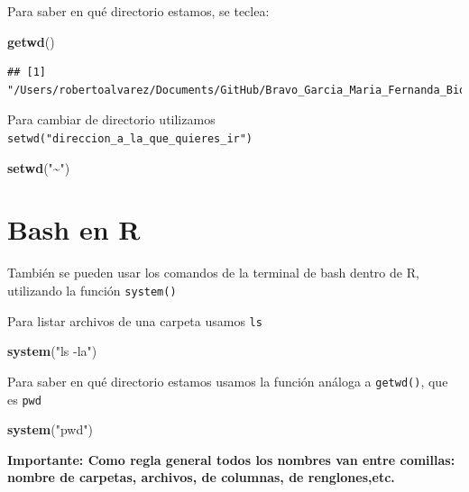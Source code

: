 \documentclass[
]{book}
\newenvironment{Shaded}{\begin{snugshade}}{\end{snugshade}}
\newcommand{\FunctionTok}[1]{\textcolor[rgb]{0.13,0.29,0.53}{\textbf{#1}}}
\newcommand{\NormalTok}[1]{#1}
\newcommand{\StringTok}[1]{\textcolor[rgb]{0.31,0.60,0.02}{#1}}
\begin{document}
Para saber en qué directorio estamos, se teclea:

\begin{Shaded}
\begin{Highlighting}[]
\FunctionTok{getwd}\NormalTok{()}
\end{Highlighting}
\end{Shaded}

\begin{verbatim}
## [1] "/Users/robertoalvarez/Documents/GitHub/Bravo_Garcia_Maria_Fernanda_Bioinfo_2024"
\end{verbatim}

Para cambiar de directorio utilizamos \texttt{setwd("direccion\_a\_la\_que\_quieres\_ir")}

\begin{Shaded}
\begin{Highlighting}[]
\FunctionTok{setwd}\NormalTok{(}\StringTok{"\textasciitilde{}"}\NormalTok{)}
\end{Highlighting}
\end{Shaded}

\section{Bash en R}\label{bash-en-r}

También se pueden usar los comandos de la terminal de bash dentro de R, utilizando la función \texttt{system()}

Para listar archivos de una carpeta usamos \texttt{ls}

\begin{Shaded}
\begin{Highlighting}[]
\FunctionTok{system}\NormalTok{(}\StringTok{"ls {-}la"}\NormalTok{)}
\end{Highlighting}
\end{Shaded}

Para saber en qué directorio estamos usamos la función análoga a \texttt{getwd()}, que es \texttt{pwd}

\begin{Shaded}
\begin{Highlighting}[]
\FunctionTok{system}\NormalTok{(}\StringTok{"pwd"}\NormalTok{)}
\end{Highlighting}
\end{Shaded}

\textbf{Importante: Como regla general todos los nombres van entre comillas: nombre de carpetas, archivos, de columnas, de renglones,etc.}
\end{document}
